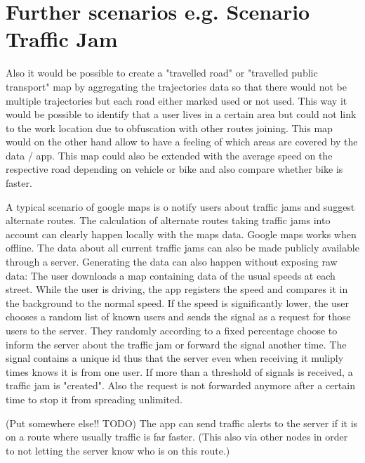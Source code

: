 \section{Further scenarios e.g. Scenario Traffic Jam}
Also it would be possible to create a "travelled road" or "travelled public transport" map by aggregating the trajectories data so that there would not be multiple trajectories but each road either marked used or not used. This way it would be possible to identify that a user lives in a certain area but could not link to the work location due to obfuscation with other routes joining. This map would on the other hand allow to have a feeling of which areas are covered by the data / app. This map could also be extended with the average speed on the respective road depending on vehicle or bike and also compare whether bike is faster.

A typical scenario of google maps is o notify users about traffic jams and suggest alternate routes. The calculation of alternate routes taking traffic jams into account can clearly happen locally with the maps data. Google maps works when offline. The data about all current traffic jams can also be made publicly available through a server. Generating the data can also happen without exposing raw data: The user downloads a map containing data of the usual speeds at each street. While the user is driving, the app registers the speed and compares it in the background to the normal speed. If the speed is significantly lower, the user chooses a random list of known users and sends the signal as a request for those users to the server. They randomly according to a fixed percentage choose to inform the server about the traffic jam or forward the signal another time. The signal contains a unique id thus that the server even when receiving it muliply times knows it is from one user. If more than a threshold of signals is received, a traffic jam is "created". Also the request is not forwarded anymore after a certain time to stop it from spreading unlimited.

(Put somewhere else!! TODO) The app can send traffic alerts to the server if it is on a route where usually traffic is far faster. (This also via other nodes in order to not letting the server know who is on this route.)